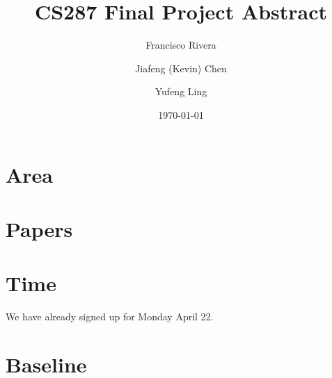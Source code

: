 \documentclass{article}
\begin{document}
\title{CS287 Final Project Abstract}
\author{Francisco Rivera \and Jiafeng (Kevin) Chen \and Yufeng Ling}
\date{\today}

\maketitle

\section{Area}


\section{Papers}

\cite{van2017neural}

\cite{kaiser2018fast}


\section{Time}

We have already signed up for Monday April 22.

\section{Baseline}




\end{document}
